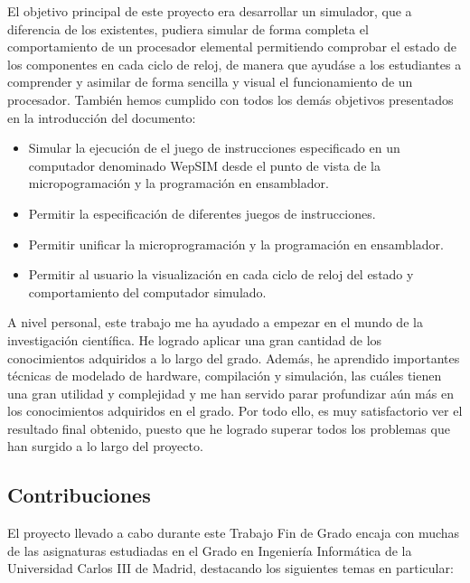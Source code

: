 El objetivo principal de este proyecto era desarrollar un simulador, que a diferencia de los existentes, pudiera simular de forma completa el comportamiento de un procesador elemental permitiendo comprobar el estado de los componentes en cada ciclo de reloj, de manera que ayudáse a los estudiantes a comprender y asimilar de forma sencilla y visual el funcionamiento de un procesador.  También hemos cumplido con todos los demás objetivos presentados en la introducción del documento:

\begin{itemize}

\item Simular la ejecución de el juego de instrucciones especificado en un computador denominado WepSIM desde el punto de vista de la micropogramación y la programación en ensamblador.

\item Permitir la especificación de diferentes juegos de instrucciones.

\item Permitir unificar la microprogramación y la programación en ensamblador.

\item Permitir al usuario la visualización en cada ciclo de reloj del estado y comportamiento del computador simulado.

\end{itemize}

A nivel personal, este trabajo me ha ayudado a empezar en el mundo de la investigación científica. He logrado aplicar una gran cantidad de los conocimientos adquiridos a lo largo del grado. Además, he aprendido importantes técnicas de modelado de hardware, compilación y simulación, las cuáles tienen una gran utilidad y complejidad y me han servido parar profundizar aún más en los conocimientos adquiridos en el grado. Por todo ello, es muy satisfactorio ver el resultado final obtenido, puesto que he logrado superar todos los problemas que han surgido a lo largo del proyecto.

\subsection{Contribuciones}

El proyecto llevado a cabo durante este Trabajo Fin de Grado encaja con muchas de las asignaturas estudiadas en el Grado en Ingeniería Informática de la Universidad Carlos III de Madrid, destacando los siguientes temas en particular:

